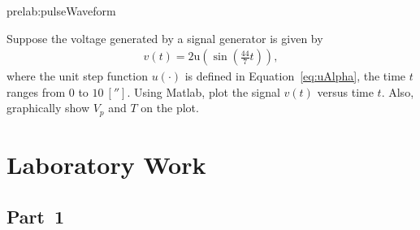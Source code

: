 \begin{prelab}{prelab:pulseWaveform}

  Suppose the voltage generated by a signal generator is given by %
  \begin{align*}
    v(t) = 2\mathrm{u}\left(\sin\left(\frac{44}{7}t\right)\right),
  \end{align*}
  where the unit step function $u(\cdot)$ is defined in Equation~\eqref{eq:uAlpha},  the time $t$ ranges from $0$ to $10~[\second].$ Using Matlab, plot the signal $v(t)$ versus time $t.$ Also, graphically show $V_p$ and $T$ on the plot. 
\end{prelab}


\section{Laboratory Work}

\subsection{Part~1}
\label{sec:part1}


